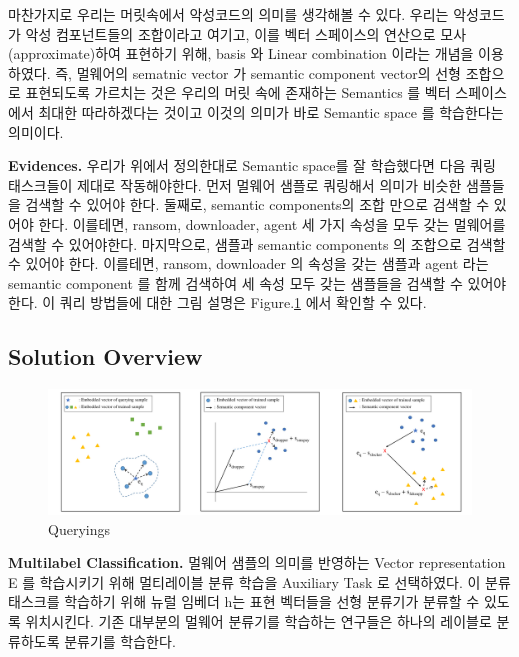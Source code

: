 마찬가지로 우리는 머릿속에서 악성코드의 의미를 생각해볼 수 있다. 우리는 악성코드가 악성 컴포넌트들의 조합이라고 여기고, 이를 벡터 스페이스의 연산으로 모사(approximate)하여 표현하기 위해, basis 와 Linear combination 이라는 개념을 이용하였다. 즉, 멀웨어의 sematnic vector 가 semantic component vector의 선형 조합으로 표현되도록 가르치는 것은 우리의 머릿 속에 존재하는 Semantics 를 벡터 스페이스에서 최대한 따라하겠다는 것이고 이것의 의미가 바로 Semantic space 를 학습한다는 의미이다. 

\textbf{Evidences. } 우리가 위에서 정의한대로 Semantic space를 잘 학습했다면 다음 쿼링 태스크들이 제대로 작동해야한다. 먼저 멀웨어 샘플로 쿼링해서 의미가 비슷한 샘플들을 검색할 수 있어야 한다. 둘째로, semantic components의 조합 만으로 검색할 수 있어야 한다. 이를테면, ransom, downloader, agent 세 가지 속성을 모두 갖는 멀웨어를 검색할 수 있어야한다. 마지막으로, 샘플과 semantic components 의 조합으로 검색할 수 있어야 한다. 이를테면, ransom, downloader 의 속성을 갖는 샘플과 agent 라는 semantic component 를 함께 검색하여 세 속성 모두 갖는 샘플들을 검색할 수 있어야 한다. 이 쿼리 방법들에 대한 그림 설명은 Figure.\ref{fig:qualitative_all} 에서 확인할 수 있다. 

\subsection{Solution Overview}
\begin{figure}[!htb] %
  \includegraphics[width=\textwidth]{../../figures/qualitative_all_fix.pdf}
  \caption{Queryings}
  \label{fig:qualitative_all}
\end{figure}

\textbf{Multilabel Classification. }
멀웨어 샘플의 의미를 반영하는 Vector representation E 를 학습시키기 위해 멀티레이블 분류 학습을 Auxiliary Task 로 선택하였다. 이 분류 태스크를 학습하기 위해 뉴럴 임베더 h는 표현 벡터들을 선형 분류기가 분류할 수 있도록 위치시킨다. 기존 대부분의 멀웨어 분류기를 학습하는 연구들은 하나의 레이블로 분류하도록 분류기를 학습한다. 

